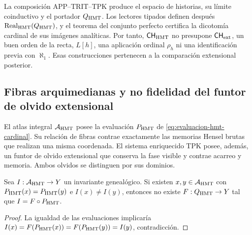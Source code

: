 \begin{remark}
\label{rem:autonomia-ch-hmt-autonomo}
La composición APP--TRIT--TPK produce el espacio de historias, su límite
coinductivo y el portador \(Q_{\rm HMT}\). Los lectores tipados definen
después \(\operatorname{Real}_{\rm HMT}(Q_{\rm HMT})\), y el teorema del
conjunto perfecto certifica la dicotomía cardinal de sus imágenes
analíticas. Por tanto, \(\mathsf{CH}_{\rm HMT}\) no presupone
\(\mathsf{CH}_{\rm ext}\), un buen orden de la recta, \(L[h]\), una
aplicación ordinal \(\rho_h\) ni una identificación previa con
\(\aleph_1\). Esas construcciones pertenecen a la comparación extensional
posterior.
\end{remark}

\subsection{Fibras arquimedianas y no fidelidad del funtor de olvido extensional}

El atlas integral \(\mathcal A_{\rm HMT}\) posee la evaluación
\(P_{\rm HMT}\) de \eqref{eq:evaluacion-hmt-cardinal}. Su relación de fibras
contrae exactamente las memorias Hensel brutas que realizan una misma
coordenada. El sistema enriquecido TPK posee, además, un funtor de olvido extensional que
conserva la fase visible y contrae acarreo y memoria. Ambos olvidos se
distinguen por sus dominios.

\begin{proposition}
\label{prop:no-fidelidad-evaluacion-arquimediana}
Sea \(I:\mathcal A_{\rm HMT}\to Y\) un invariante geneal\'ogico. Si existen
\(x,y\in\mathcal A_{\rm HMT}\) con
\(P_{\rm HMT}(x)=P_{\rm HMT}(y)\) e \(I(x)\neq I(y)\), entonces no existe
\(F:Q_{\rm HMT}\to Y\) tal que \(I=F\circ P_{\rm HMT}\).
\end{proposition}

\begin{proof}
La igualdad de las evaluaciones implicar\'ia
\(I(x)=F(P_{\rm HMT}(x))=F(P_{\rm HMT}(y))=I(y)\), contradicci\'on.
\end{proof}

